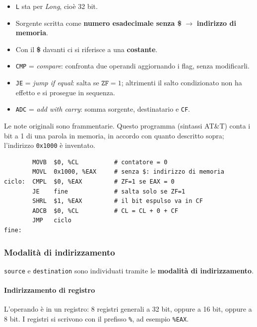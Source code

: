 \documentclass[11pt,a4paper]{article}
\newcommand{\reg}[1]{\texttt{\%#1}}
\begin{document}
\begin{itemize}[leftmargin=*]
  \item \texttt{L} sta per \emph{Long}, cioè 32 bit.
  \item Sorgente scritta come \textbf{numero esadecimale senza \$} $\to$ \textbf{indirizzo di memoria}.
  \item Con il \textbf{\$} davanti ci si riferisce a una \textbf{costante}.
  \item \texttt{CMP} = \emph{compare}: confronta due operandi aggiornando i flag, senza modificarli.
  \item \texttt{JE} = \emph{jump if equal}: salta se $\texttt{ZF}=1$; altrimenti il salto condizionato non ha effetto e si prosegue in sequenza.
  \item \texttt{ADC} = \emph{add with carry}: somma sorgente, destinatario e \texttt{CF}.
\end{itemize}

\begin{integrazione}
Le note originali sono frammentarie. Questo programma (sintassi AT\&T) conta i bit a 1 di una parola in memoria, in accordo con quanto descritto sopra; l'indirizzo \texttt{0x1000} è inventato.
\begin{lstlisting}
        MOVB  $0, %CL          # contatore = 0
        MOVL  0x1000, %EAX     # senza $: indirizzo di memoria
ciclo:  CMPL  $0, %EAX         # ZF=1 se EAX = 0
        JE    fine             # salta solo se ZF=1
        SHRL  $1, %EAX         # il bit espulso va in CF
        ADCB  $0, %CL          # CL = CL + 0 + CF
        JMP   ciclo
fine:
\end{lstlisting}
\end{integrazione}

\subsubsection*{Modalità di indirizzamento}

\texttt{source} e \texttt{destination} sono individuati tramite le \textbf{modalità di indirizzamento}.

\paragraph*{Indirizzamento di registro}

L'operando è in un registro: 8 registri generali a 32 bit, oppure a 16 bit, oppure a 8 bit. I registri si scrivono con il prefisso \texttt{\%}, ad esempio \reg{EAX}.
\end{document}
